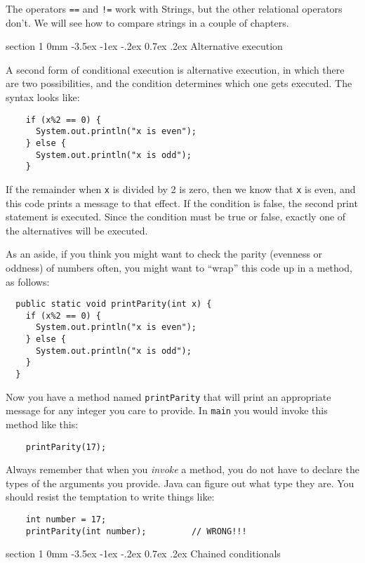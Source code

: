 \documentclass{book}
\makeatletter
\renewcommand{\section}{\@startsection 
    {section} {1} {0mm}%
    {-3.5ex \@plus -1ex \@minus -.2ex}%
    {0.7ex \@plus.2ex}%
    {\normalfont\Large\bfseries}}
\makeatother
\begin{document}
The operators {\tt ==} and {\tt !=} work with Strings, but the other
relational operators don't.  We will see how to compare strings in
a couple of chapters.


\section {Alternative execution}
\label{alternative}

A second form of conditional execution is alternative execution,
in which there are two possibilities, and the condition determines
which one gets executed.  The syntax looks like:

\begin{verbatim}
    if (x%2 == 0) {
      System.out.println("x is even");
    } else {
      System.out.println("x is odd");
    }
\end{verbatim}
%
If the remainder when {\tt x} is divided by 2 is zero, then
we know that {\tt x} is even, and this code prints a message
to that effect.  If the condition is false, the second
print statement is executed.  Since the condition must
be true or false, exactly one of the alternatives will be
executed.

As an aside, if you think you might want to check the parity
(evenness or oddness) of numbers often, you might want to
``wrap'' this code up in a method, as follows:

\begin{verbatim}
  public static void printParity(int x) {
    if (x%2 == 0) {
      System.out.println("x is even");
    } else {
      System.out.println("x is odd");
    }
  }
\end{verbatim}
%
Now you have a method named {\tt printParity} that will print
an appropriate message for any integer you care to provide.
In {\tt main} you would invoke this method like this:

\begin{verbatim}
    printParity(17);
\end{verbatim}
%
Always remember that when you {\em invoke} a method, you do
not have to declare the types of the arguments you provide.
Java can figure out what type they are.  You should resist the
temptation to write things like:

\begin{verbatim}
    int number = 17;
    printParity(int number);         // WRONG!!!
\end{verbatim}


\section {Chained conditionals}
\end{document}
